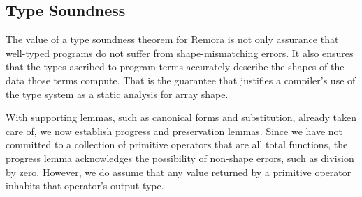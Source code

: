 \subsection{Type Soundness}
\label{SoundnessSection}
The value of a type soundness theorem for Remora is not only assurance
that well-typed programs do not suffer from shape-mismatching errors.
It also ensures that the types ascribed to program terms
accurately describe the shapes of the data those terms compute.
That is the guarantee that justifies a compiler's use of the type system
as a static analysis for array shape.

With supporting lemmas,
such as canonical forms and substitution,
already taken care of,
we now establish progress and preservation lemmas.
Since we have not committed to
a collection of primitive operators that are all total functions,
the progress lemma acknowledges the possibility of non-shape errors,
such as division by zero.
However, we do assume that any value returned by a primitive operator
inhabits that operator's output type.

